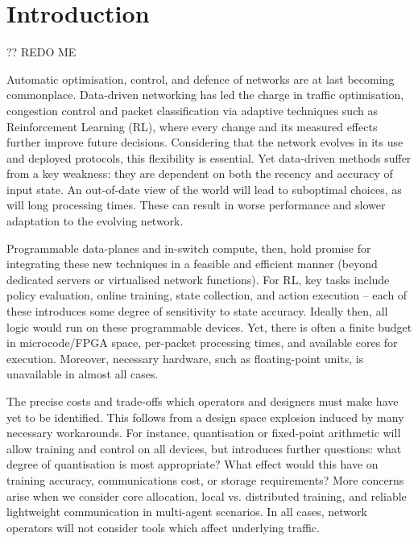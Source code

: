 \documentclass[sigconf,natbib=false]{acmart}
\begin{document}
\setlength{\aweboxleftmargin}{0.12\linewidth}
\setlength{\aweboxcontentwidth}{1.97\linewidth}
	
\section{Introduction}
?? REDO ME

Automatic optimisation, control, and defence of networks are at last becoming commonplace. Data-driven networking has led the charge in traffic optimisation, congestion control and packet classification via adaptive techniques such as Reinforcement Learning (RL), where every change and its measured effects further improve future decisions. Considering that the network evolves in its use and deployed protocols, this flexibility is essential. Yet data-driven methods suffer from a key weakness: they are dependent on both the recency and accuracy of input state. An out-of-date view of the world will lead to suboptimal choices, as will long processing times. These can result in worse performance and slower adaptation to the evolving network.

Programmable data-planes and in-switch compute, then, hold promise for integrating these new techniques in a feasible and efficient manner (beyond dedicated servers or virtualised network functions). For RL, key tasks include policy evaluation, online training, state collection, and action execution -- each of these introduces some degree of sensitivity to state accuracy. Ideally then, all logic would run on these programmable devices. Yet, there is often a finite budget in microcode/FPGA space, per-packet processing times, and available cores for execution. Moreover, necessary hardware, such as floating-point units, is unavailable in almost all cases.

The precise costs and trade-offs which operators and designers must make have yet to be identified. This follows from a design space explosion induced by many necessary workarounds. For instance, quantisation or fixed-point arithmetic will allow training and control on all devices, but introduces further questions: what degree of quantisation is most appropriate? What effect would this have on training accuracy, communications cost, or storage requirements? More concerns arise when we consider core allocation, local vs. distributed training, and reliable lightweight communication in multi-agent scenarios. In all cases, network operators will not consider tools which affect underlying traffic.
\end{document}
